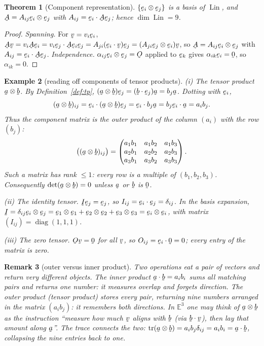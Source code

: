 \documentclass[17pt,a4paper]{extreport}
\DeclareRobustCommand{\vek}[1]{\underaccent{\tilde}{#1}}
\newcommand{\Et}{\mathbb{E}^{3}}
\newcommand{\Lin}{\operatorname{Lin}}
\newcommand{\tr}{\operatorname{tr}}
\newcommand{\I}{\vek{I}}
\newcommand{\Ob}{\vek{O}}
\newcommand{\ba}{\vek{a}}
\newcommand{\bb}{\vek{b}}
\newcommand{\bv}{\vek{v}}
\newcommand{\be}{\vek{e}}
\newcommand{\bze}{\vek{0}}
\newcommand{\bA}{\vek{A}}
\newcommand{\dd}{\delta}
\newcommand{\ip}[2]{#1\cdot#2}
\theoremstyle{scplain}
\newtheorem{theorem}{Theorem}[chapter]
\theoremstyle{scdefn}
\newtheorem{remark}[theorem]{Remark}
\newtheorem{example}[theorem]{Example}
\theoremstyle{scplain}
\begin{document}
\begin{theorem}[Component representation]\label{thm:comprep}
$\{\be_{i}\otimes\be_{j}\}$ is a basis of $\Lin$, and
$\bA=A_{ij}\be_{i}\otimes\be_{j}$ with $A_{ij}=\ip{\be_{i}}{\bA\be_{j}}$;
hence $\dim\Lin=9$.
\end{theorem}

\begin{proof}
\emph{Spanning.} For $\bv=v_{i}\be_{i}$,
$\bA\bv=v_{i}\bA\be_{i}=v_{i}\ip{\be_{j}}{\bA\be_{i}}\be_{j}
=A_{ji}(\ip{\be_{i}}\bv)\be_{j}=(A_{ji}\be_{j}\otimes\be_{i})\bv$, so
$\bA=A_{ij}\be_{i}\otimes\be_{j}$ with $A_{ij}=\ip{\be_{i}}{\bA\be_{j}}$.
\emph{Independence.} $\alpha_{ij}\be_{i}\otimes\be_{j}=\Ob$ applied to
$\be_{k}$ gives $\alpha_{ik}\be_{i}=\bze$, so $\alpha_{ik}=0$.
\end{proof}

\begin{example}[reading off components of tensor products]\label{ex:tp}
\emph{(i) The tensor product $\ba\otimes\bb$.}
By Definition~\ref{def:tp},
$(\ba\otimes\bb)\be_{j}=(\ip\bb{\be_{j}})\ba=b_{j}\ba$. Dotting with
$\be_{i}$,
\[
(\ba\otimes\bb)_{ij}=\ip{\be_{i}}{(\ba\otimes\bb)\be_{j}}
=\ip{\be_{i}}{b_{j}\ba}=b_{j}\ip{\be_{i}}{\ba}=a_{i}b_{j}.
\]
Thus the component matrix is the outer product of the column $(a_i)$ with
the row $(b_j)$:
\[
\bigl((\ba\otimes\bb)_{ij}\bigr)=
\begin{pmatrix}a_{1}b_{1}&a_{1}b_{2}&a_{1}b_{3}\\
a_{2}b_{1}&a_{2}b_{2}&a_{2}b_{3}\\
a_{3}b_{1}&a_{3}b_{2}&a_{3}b_{3}\end{pmatrix}.
\]
Such a matrix has rank $\le1$: every row is a multiple of $(b_1,b_2,b_3)$.
Consequently $\det(\ba\otimes\bb)=0$ unless $\ba$ or $\bb$ is $\bze$.

\emph{(ii) The identity tensor.}
$\I\be_{j}=\be_{j}$, so $I_{ij}=\ip{\be_{i}}{\be_{j}}=\dd_{ij}$. In the
basis expansion,
$\I=\dd_{ij}\be_{i}\otimes\be_{j}=\be_{1}\otimes\be_{1}+\be_{2}\otimes\be_{2}
+\be_{3}\otimes\be_{3}=\be_{i}\otimes\be_{i}$,
with matrix $(I_{ij})=\operatorname{diag}(1,1,1)$.

\emph{(iii) The zero tensor.}
$\Ob\bv=\bze$ for all $\bv$, so $O_{ij}=\ip{\be_{i}}{\bze}=0$;
every entry of the matrix is zero.
\end{example}

\begin{remark}[outer versus inner product]\label{rem:outer}
Two operations eat a pair of vectors and return very different objects.
The \emph{inner product} $\ip\ba\bb=a_ib_i$ sums all matching pairs and
returns one number: it measures overlap and forgets direction. The
\emph{outer product} (tensor product) stores every pair, returning
nine numbers arranged in the matrix $(a_ib_j)$: it remembers both
directions. In $\Et$ one may think of $\ba\otimes\bb$ as the instruction
``measure how much $\bv$ aligns with $\bb$ (via $\ip\bb\bv$), then lay
that amount along $\ba$''. The trace connects the two:
$\tr(\ba\otimes\bb)=a_ib_j\dd_{ij}=a_ib_i=\ip\ba\bb$,
collapsing the nine entries back to one.
\end{remark}
\end{document}
